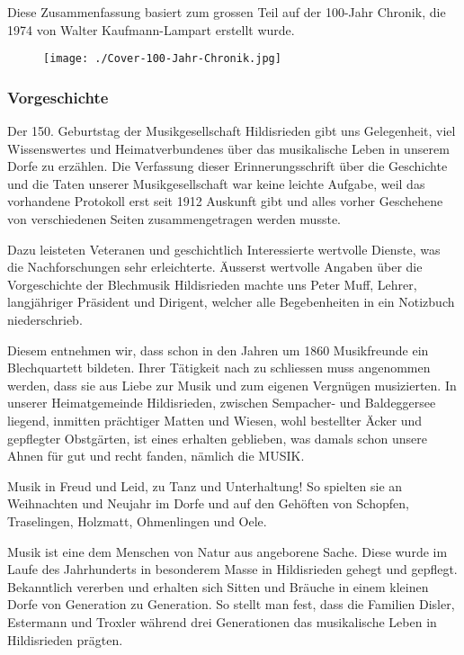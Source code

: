 Diese Zusammenfassung basiert zum grossen Teil auf der 100-Jahr Chronik, die
1974 von Walter Kaufmann-Lampart erstellt wurde.
\begin{figure}[ht]
    \texttt{[image: ./Cover-100-Jahr-Chronik.jpg]}
\end{figure}

\subsubsection*{Vorgeschichte}

\begin{history}

    Der 150. Geburtstag der Musikgesellschaft Hildisrieden gibt uns Gelegenheit,
    viel Wissenswertes und Heimatverbundenes über das musikalische Leben in
    unserem Dorfe zu erzählen. Die Verfassung dieser Erinnerungsschrift über die
    Geschichte und die Taten unserer Musikgesellschaft war keine leichte
    Aufgabe, weil das vorhandene Protokoll erst seit 1912 Auskunft gibt und
    alles vorher Geschehene von verschiedenen Seiten zusammengetragen werden
    musste.

    Dazu leisteten Veteranen und geschichtlich Interessierte wertvolle Dienste,
    was die Nachforschungen sehr erleichterte. Äusserst wertvolle Angaben über
    die Vorgeschichte der Blechmusik Hildisrieden machte uns Peter Muff, Lehrer,
    langjähriger Präsident und Dirigent, welcher alle Begebenheiten in ein
    Notizbuch niederschrieb.

    Diesem entnehmen wir, dass schon in den Jahren um 1860 Musikfreunde ein
    Blechquartett bildeten. Ihrer Tätigkeit nach zu schliessen muss angenommen
    werden, dass sie aus Liebe zur Musik und zum eigenen Vergnügen musizierten.
    In unserer Heimatgemeinde Hildisrieden, zwischen Sempacher- und Baldeggersee
    liegend, inmitten prächtiger Matten und Wiesen, wohl bestellter Äcker und
    gepflegter Obstgärten, ist eines erhalten geblieben, was damals schon unsere
    Ahnen für gut und recht fanden, nämlich die MUSIK.

    Musik in Freud und Leid, zu Tanz und Unterhaltung! So spielten sie an
    Weihnachten und Neujahr im Dorfe und auf den Gehöften von Schopfen,
    Traselingen, Holzmatt, Ohmenlingen und Oele.

    Musik ist eine dem Menschen von Natur aus angeborene Sache. Diese wurde im
    Laufe des Jahrhunderts in besonderem Masse in Hildisrieden gehegt und
    gepflegt. Bekanntlich vererben und erhalten sich Sitten und Bräuche in einem
    kleinen Dorfe von Generation zu Generation. So stellt man fest, dass die
    Familien Disler, Estermann und Troxler während drei Generationen das
    musikalische Leben in Hildisrieden prägten.

\end{history}
